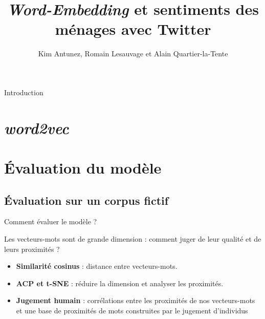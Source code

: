 \documentclass[10pt,xcolor=table,color={dvipsnames,usenames},ignorenonframetext,usepdftitle=false,french]{beamer}
\title{\emph{Word-Embedding} et sentiments des ménages avec Twitter}
\author{Kim Antunez, Romain Lesauvage et Alain Quartier-la-Tente}
\date{}
\begin{document}
\begin{frame}
\titlepage
\end{frame}

\begin{frame}{Introduction}
\protect\hypertarget{introduction}{}

\resizebox{\textwidth}{!}{}

\end{frame}

\hypertarget{word2vec}{%
\section{\texorpdfstring{\emph{word2vec}}{word2vec}}\label{word2vec}}

\hypertarget{uxe9valuation-du-moduxe8le}{%
\section{Évaluation du modèle}\label{uxe9valuation-du-moduxe8le}}

\hypertarget{uxe9valuation-sur-un-corpus-fictif}{%
\subsection{Évaluation sur un corpus
fictif}\label{uxe9valuation-sur-un-corpus-fictif}}

\begin{frame}{Comment évaluer le modèle ?}
\protect\hypertarget{comment-uxe9valuer-le-moduxe8le}{}

Les vecteurs-mots sont de grande dimension : comment juger de leur
qualité et de leurs proximités ?

\begin{itemize}
\item
  \textbf{Similarité cosinus} : distance entre vecteurs-mots.
\item
  \textbf{ACP et t-SNE} : réduire la dimension et analyser les
  proximités.
\item
  \textbf{Jugement humain} : corrélations entre les proximités de nos
  vecteurs-mots et une base de proximités de mots construites par le
  jugement d'individus
\end{itemize}

\end{frame}
\end{document}
